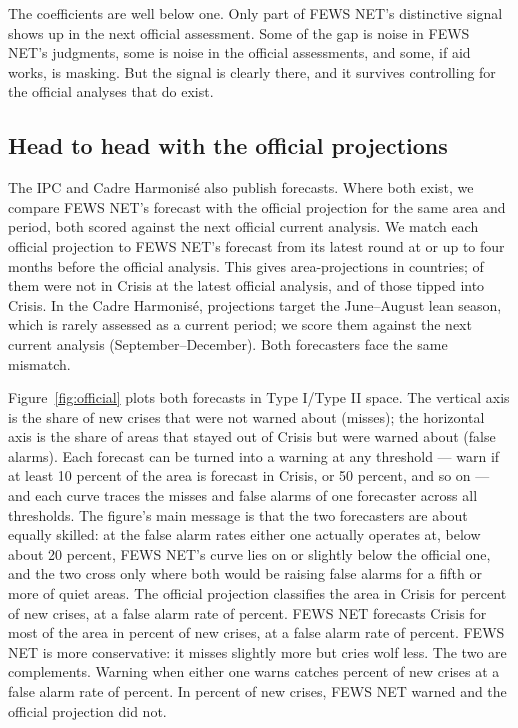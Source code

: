 \documentclass[11pt]{article}
\begin{document}
The coefficients are well below one. Only part of FEWS NET's distinctive signal shows up in the next official assessment. Some of the gap is noise in FEWS NET's judgments, some is noise in the official assessments, and some, if aid works, is masking. But the signal is clearly there, and it survives controlling for the official analyses that do exist.

\subsection{Head to head with the official projections}

The IPC and Cadre Harmonis\'e also publish forecasts. Where both exist, we compare FEWS NET's forecast with the official projection for the same area and period, both scored against the next official current analysis. We match each official projection to FEWS NET's forecast from its latest round at or up to four months before the official analysis. This gives \offNall{} area-projections in \offCountriesAll{} countries; \offN{} of them were not in Crisis at the latest official analysis, and \offNew{} of those tipped into Crisis. In the Cadre Harmonis\'e, projections target the June--August lean season, which is rarely assessed as a current period; we score them against the next current analysis (September--December). Both forecasters face the same mismatch.

Figure~\ref{fig:official} plots both forecasts in Type I/Type II space. The vertical axis is the share of new crises that were not warned about (misses); the horizontal axis is the share of areas that stayed out of Crisis but were warned about (false alarms). Each forecast can be turned into a warning at any threshold --- warn if at least 10 percent of the area is forecast in Crisis, or 50 percent, and so on --- and each curve traces the misses and false alarms of one forecaster across all thresholds. The figure's main message is that the two forecasters are about equally skilled: at the false alarm rates either one actually operates at, below about 20 percent, FEWS NET's curve lies on or slightly below the official one, and the two cross only where both would be raising false alarms for a fifth or more of quiet areas. The official projection classifies the area in Crisis for \offHitOfficial{} percent of new crises, at a false alarm rate of \offFaOfficial{} percent. FEWS NET forecasts Crisis for most of the area in \offHitFews{} percent of new crises, at a false alarm rate of \offFaFews{} percent. FEWS NET is more conservative: it misses slightly more but cries wolf less. The two are complements. Warning when either one warns catches \offHitEither{} percent of new crises at a false alarm rate of \offFaEither{} percent. In \offHitOnlyFews{} percent of new crises, FEWS NET warned and the official projection did not.
\end{document}

